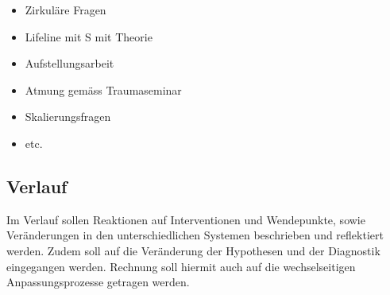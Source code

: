 \begin{itemize}
 \item Zirkuläre Fragen
 \item Lifeline mit S mit Theorie
 \item Aufstellungsarbeit
 \item Atmung gemäss Traumaseminar
 \item Skalierungsfragen
 \item etc.
\end{itemize}


\subsection{Verlauf}\label{Verlauf} Im Verlauf sollen Reaktionen auf Interventionen und Wendepunkte, sowie Veränderungen in den unterschiedlichen Systemen beschrieben und reflektiert werden. Zudem soll auf die Veränderung der Hypothesen und der Diagnostik eingegangen werden. Rechnung soll hiermit auch auf die wechselseitigen Anpassungsprozesse getragen werden.

